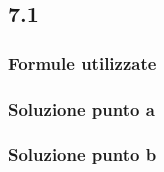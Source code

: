 \documentclass[../../main.tex]{subfiles}
\begin{document}
\subsection*{7.1}
\subsubsection*{Formule utilizzate}
\subsubsection*{Soluzione punto a}
\subsubsection*{Soluzione punto b}
\newpage
\end{document}

